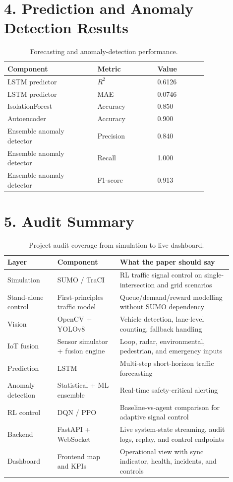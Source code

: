 \documentclass[11pt,a4paper]{article}
\begin{document}
\section*{4. Prediction and Anomaly Detection Results}
\begin{table}[h!]
\centering
\caption{Forecasting and anomaly-detection performance.}
\begin{tabular}{p{0.36\linewidth} p{0.24\linewidth} p{0.20\linewidth}}
\toprule
\textbf{Component} & \textbf{Metric} & \textbf{Value} \\
\midrule
LSTM predictor & $R^2$ & 0.6126 \\
LSTM predictor & MAE & 0.0746 \\
IsolationForest & Accuracy & 0.850 \\
Autoencoder & Accuracy & 0.900 \\
Ensemble anomaly detector & Precision & 0.840 \\
Ensemble anomaly detector & Recall & 1.000 \\
Ensemble anomaly detector & F1-score & 0.913 \\
\bottomrule
\end{tabular}
\end{table}

\section*{5. Audit Summary}
\begin{table}[h!]
\centering
\caption{Project audit coverage from simulation to live dashboard.}
\begin{tabular}{p{0.20\linewidth} p{0.25\linewidth} p{0.45\linewidth}}
\toprule
\textbf{Layer} & \textbf{Component} & \textbf{What the paper should say} \\
\midrule
Simulation & SUMO / TraCI & RL traffic signal control on single-intersection and grid scenarios \\
Stand-alone control & First-principles traffic model & Queue/demand/reward modelling without SUMO dependency \\
Vision & OpenCV + YOLOv8 & Vehicle detection, lane-level counting, fallback handling \\
IoT fusion & Sensor simulator + fusion engine & Loop, radar, environmental, pedestrian, and emergency inputs \\
Prediction & LSTM & Multi-step short-horizon traffic forecasting \\
Anomaly detection & Statistical + ML ensemble & Real-time safety-critical alerting \\
RL control & DQN / PPO & Baseline-vs-agent comparison for adaptive signal control \\
Backend & FastAPI + WebSocket & Live system-state streaming, audit logs, replay, and control endpoints \\
Dashboard & Frontend map and KPIs & Operational view with sync indicator, health, incidents, and controls \\
\bottomrule
\end{tabular}
\end{table}
\end{document}
